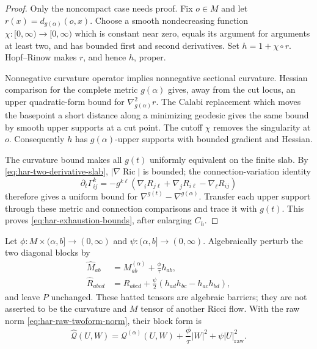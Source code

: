 \documentclass[10pt]{coll-l}
\theoremstyle{definition}
\theoremstyle{remark}
\numberwithin{section}{chapter}
\numberwithin{equation}{chapter}
\newcommand{\Ric}{\operatorname{Ric}}
\begin{document}
\begin{proof}
Only the noncompact case needs proof.  Fix $o\in M$ and let
$r(x)=d_{g(\alpha)}(o,x)$.  Choose a smooth nondecreasing function
$\chi:[0,\infty)\to[0,\infty)$ which is constant near zero, equals its
argument for arguments at least two, and has bounded first and second
derivatives.  Set $h=1+\chi\circ r$.  Hopf--Rinow makes $r$, and hence $h$,
proper.

Nonnegative curvature operator implies nonnegative sectional curvature.
Hessian comparison for the complete metric $g(\alpha)$ gives, away from the
cut locus, an upper quadratic-form bound for $\nabla^2_{g(\alpha)}r$.
The Calabi replacement which moves the basepoint a short distance along a
minimizing geodesic gives the same bound by smooth upper supports at a cut
point.  The cutoff $\chi$ removes the singularity at $o$.  Consequently
$h$ has $g(\alpha)$-upper supports with bounded gradient and Hessian.

The curvature bound makes all $g(t)$ uniformly equivalent on the finite
slab.  By \eqref{eq:har-two-derivative-slab}, $|\nabla\Ric|$ is bounded; the
connection-variation identity
\begin{equation}
 \partial_t\Gamma^k_{ij}
  =-g^{k\ell}(\nabla_iR_{j\ell}+\nabla_jR_{i\ell}
                          -\nabla_\ell R_{ij})           \label{eq:har-Christoffel-variation}
\end{equation}
therefore gives a uniform bound for
$\nabla^{g(t)}-\nabla^{g(\alpha)}$.  Transfer each upper support through
these metric and connection comparisons and trace it with $g(t)$.  This
proves \eqref{eq:har-exhaustion-bounds}, after enlarging $C_h$.
\end{proof}

Let $\phi:M\times(\alpha,b]\to(0,\infty)$ and
$\psi:(\alpha,b]\to(0,\infty)$.  Algebraically perturb the two diagonal
blocks by
\begin{align}
 \widehat M_{ab}&=M^{(\alpha)}_{ab}+\frac\phi\tau h_{ab},               \label{eq:har-hat-M}\\
 \widehat R_{abcd}
   &=R_{abcd}+\frac\psi2(h_{ad}h_{bc}-h_{ac}h_{bd}),                   \label{eq:har-hat-Rm}
\end{align}
and leave $P$ unchanged.  These hatted tensors are algebraic barriers; they
are not asserted to be the curvature and $M$ tensor of another Ricci flow.
With the raw norm \eqref{eq:har-raw-twoform-norm}, their block form is
\begin{equation}
 \widehat{\mathscr Q}(U,W)
   =\mathscr Q^{(\alpha)}(U,W)
      +\frac\phi\tau|W|^2+\psi|U|_{\mathrm{raw}}^2.      \label{eq:har-hat-Q}
\end{equation}
\end{document}
